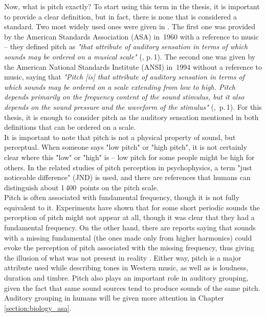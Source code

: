 Now, what is pitch exactly? To start using this term in the thesis, it is important to provide a clear definition, but in fact, there is none that is considered a standard. Two most widely used ones were given in \cite{Plack2005}. The first one was provided by the American Standards Association (ASA) in~1960 with a reference to music -- they defined pitch as \textit{"that attribute of auditory sensation in terms of which sounds may be ordered on a musical scale"} (\cite{Plack2005}, p.\,1). The second one was given by the American National Standards Institute (ANSI) in~1994 without a reference to music, saying that \textit{"Pitch [is] that attribute of auditory sensation in terms of which sounds may be ordered on a scale extending from low to high. Pitch depends primarily on the frequency content of the sound stimulus, but it also depends on the sound pressure and the waveform of the stimulus"} (\cite{Plack2005},~p.\,1). For this thesis, it is enough to consider pitch as the auditory sensation mentioned in both definitions that can be ordered on a scale.\\

It is important to note that pitch is not a physical property of sound, but perceptual. When someone says "low pitch" or "high pitch", it is not certainly clear where this "low" or "high" is -- low pitch for some people might be high for others. In the related studies of pitch perception in psychophysics, a term "just noticeable difference" (JND) is used, and there are references that humans can distinguish about 1\,400~points on the pitch scale.\\

Pitch is often associated with fundamental frequency, though it is not fully equivalent to it. Experiments have shown that for some short periodic sounds the perception of pitch might not appear at all, though it was clear that they had a fundamental frequency. On the other hand, there are reports saying that sounds with a missing fundamental (the ones made only from higher harmonics) could evoke the perception of pitch associated with the missing frequency, thus giving the illusion of what was not present in reality \cite{Schnupp2011}. Either way, pitch is a major attribute used while describing tones in Western music, as well as is loudness, duration and timbre. Pitch also plays an important role in auditory grouping, given the fact that same sound sources tend to produce sounds of the same pitch. Auditory grouping in humans will be given more attention in Chapter \ref{section:biology_asa}.




